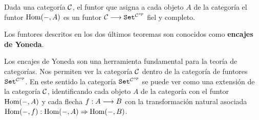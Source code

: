 \begin{theorem}
  Dada una categoría $\mathcal{C}$, el funtor que asigna a cada objeto
  $A$ de la categoría el funtor $\operatorname{Hom}(-, A)$ es un funtor
  $\mathcal{C}\longrightarrow \texttt{Set}^{\mathcal{C}^{op}}$ fiel y completo.
\end{theorem}

Los funtores descritos en los dos últimos teoremas son conocidos
como \textbf{encajes de Yoneda}.

Los encajes de Yoneda son una herramienta fundamental para la teoría
de categorías. Nos permiten ver la categoría $\mathcal{C}$ dentro de la
categoría de funtores $\texttt{Set}^{\mathcal{C}^{op}}$. En este sentido
la categoría $\texttt{Set}^{\mathcal{C}^{op}}$ se puede ver como una extensión
de la categoría $\mathcal{C}$, identificando cada objeto $A$ de la categoría
con el funtor $\operatorname{Hom}(-, A)$ y cada flecha $f : A\longrightarrow B$ con la
transformación natural asociada
$\operatorname{Hom}(-, f) : \operatorname{Hom}(-, A)\Rightarrow \operatorname{Hom}(-, B)$.
